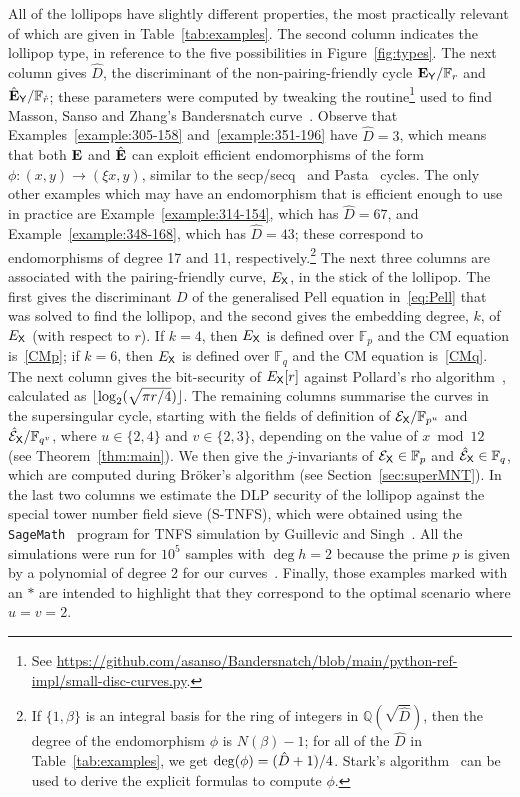 \documentclass[version=preprint]{iacrcc}
\newcommand{\F}{\mathbb{F}}
\newcommand{\EC}{\mathcal{E}}
\begin{document}
All of the lollipops have slightly different properties, the most practically relevant of which are given in Table~\ref{tab:examples}. The second column indicates the lollipop type, in reference to the five possibilities in Figure~\ref{fig:types}. The next column gives $\hat{D}$, the discriminant of the non-pairing-friendly cycle ${\bf E}_{\sf Y}/\F_r$ and $\hat{\bf E}_{\sf Y}/\F_{\hat{r}}$; these parameters were computed by tweaking the routine\footnote{See \url{https://github.com/asanso/Bandersnatch/blob/main/python-ref-impl/small-disc-curves.py}.} used to find Masson, Sanso and Zhang's Bandersnatch curve~\cite{bandersnatch}. Observe that Examples~\ref{example:305-158} and~\ref{example:351-196} have $\hat{D}=3$, which means that both ${\bf E}$ and $\hat{\bf E}$ can exploit efficient endomorphisms of the form $\phi \colon (x,y) \rightarrow (\xi x,y)$, similar to the secp/secq~\cite{secpsecq} and Pasta~\cite{pasta} cycles. The only other examples which may have an endomorphism that is efficient enough to use in practice are Example~\ref{example:314-154}, which has $\hat{D}=67$, and Example~\ref{example:348-168}, which has $\hat{D}=43$; these correspond to endomorphisms of degree 17 and 11, respectively.\footnote{If $\{1, \beta\}$ is an integral basis for the ring of integers in $\mathbb{Q}(\sqrt{\hat{D}})$, then the degree of the endomorphism $\phi$ is $N(\beta)-1$; for all of the $\hat{D}$ in Table~\ref{tab:examples}, we get ${\rm deg}(\phi)=(\hat{D}+1)/4$. Stark's algorithm~\cite{stark1973class} can be used to derive the explicit formulas to compute $\phi$.} The next three columns are associated with the pairing-friendly curve, $E_{\sf X}$, in the stick of the lollipop. The first gives the discriminant $D$ of the generalised Pell equation in~\eqref{eq:Pell} that was solved to find the lollipop, and the second gives the embedding degree, $k$, of $E_{\sf X}$ (with respect to $r$). If $k=4$, then $E_{\sf X}$ is defined over $\F_p$ and the CM equation is~\eqref{CMp}; if $k=6$, then $E_{\sf X}$ is defined over $\F_q$ and the CM equation is~\eqref{CMq}. The next column gives the bit-security of $E_{\sf X}[r]$ against Pollard's rho algorithm~\cite{pollard1978monte}, calculated as $\lfloor {\rm log}_2( \sqrt{\pi r/4})\rfloor$. The remaining columns summarise the curves in the supersingular cycle, starting with the fields of definition of $\EC_{\sf X}/\F_{p^u}$ and $\hat{\EC}_{\sf X}/\F_{q^v}$, where $u \in \{2,4\}$ and $v \in \{2,3\}$, depending on the value of $x \bmod{12}$ (see Theorem~\ref{thm:main}). We then give the $j$-invariants of $\EC_{\sf X} \in \F_p$ and $\hat{\EC}_{\sf X} \in \F_q$, which are computed during Br{\"o}ker's algorithm (see Section~\ref{sec:superMNT}). In the last two columns we estimate the DLP security of the lollipop against the special tower number field sieve (S-TNFS), which were obtained using the \texttt{SageMath}~\cite{sagemath} program for TNFS simulation by Guillevic and Singh~\cite{guillevic2021alpha}. All the simulations were run for $10^5$ samples with $\deg h = 2$ because the prime $p$ is given by a polynomial of degree 2 for our curves~\cite[Appendix B]{DBLP:conf/eurocrypt/HousniG22}. Finally, those examples marked with an $*$ are intended to highlight that they correspond to the optimal scenario where $u=v=2$. 
\end{document}
